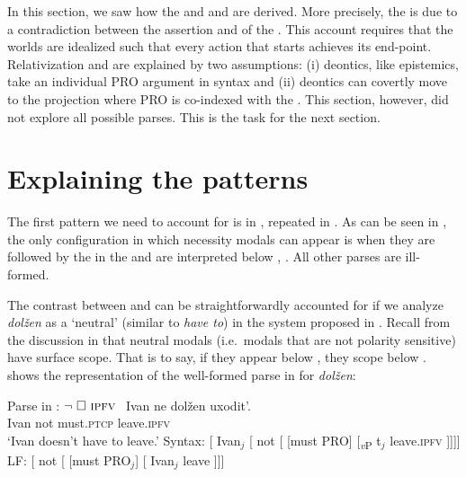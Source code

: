 \documentclass[output=paper,newtxmath,colorlinks,citecolor=brown]{langsci/langscibook}
\begin{document}
 In this section, we saw how the  and  and  are derived. More precisely, the  is due to a contradiction between the assertion and  of the . This account requires that the  worlds are idealized such that every action that starts achieves its end-point. Relativization and  are explained by two assumptions: (i) deontics, like epistemics, take an individual PRO argument  in syntax and (ii) deontics can covertly move to the  projection where PRO is co-indexed with the . This section, however, did not explore all possible parses. This is the task for the next section.

 \section{Explaining the patterns}\label{dar}
 The first pattern we need to account for is in , repeated in . As can be seen in , the only configuration in which   necessity modals can appear is when they are followed by the  in the  and are interpreted below , . All other parses are ill-formed.
 \largerpage[-1]

 	\label{arpattern}
	\ea[\ding{51}]{$\neg \ \Box$ \im \label{p1a}}
    \ex[\ding{55}]{$\,\Box\ \neg$ \im \label{p1b}}
    \ex[\ding{55}]{$\,\neg \ \Box$ \p \label{p1c}}
    \ex[\ding{55}]{$\,\Box\ \neg$ \p \label{p1d}}
    \z\z


\noindent  The contrast between  and  can be straightforwardly accounted for if we analyze  \textit{dolžen} as a `neutral'  (similar to \textit{have to}) in the system proposed in \citet{iatzei13}. Recall from the discussion in   that neutral modals (i.e.\ modals that are not polarity sensitive) have surface scope. That is to say, if they appear below , they scope below .  shows the representation of the well-formed parse in  for  \textit{dolžen}:

	\ea Parse in :  $\neg\ \Box\ \textsc{ipfv\ }$ \label{detailsp1a}
    		\ea \gll Ivan ne dolžen uxodit'. \\
            	Ivan not must.\textsc{ptcp} leave.\textsc{ipfv}\\
                \glt `Ivan doesn't have to leave.'
			\ex Syntax: [ Ivan$_j$ [ not [ [must PRO] [\textsubscript{\textit{v}P} t$_j$ leave.\textsc{ipfv} ]]]]
            \ex LF: [ not [ [must PRO$_j$]  [ Ivan$_j$ leave ]]] \label{detailsp1ac}
		\z \z
\end{document}
